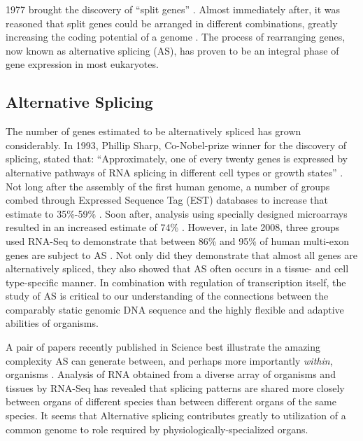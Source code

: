   1977 brought the discovery of ``split genes'' \citep{Berget1977,Chow1977}. Almost immediately after, it was reasoned that split genes could be arranged in different combinations, greatly increasing the coding potential of a genome \citep{Gilbert1978a}. The process of rearranging genes, now known as alternative splicing (AS), has proven to be an integral phase of gene expression in most eukaryotes. 

  \subsection{Alternative Splicing}\label{Intro:subsec:Alternative Splicing}

    The number of genes estimated to be alternatively spliced has grown considerably. In 1993, Phillip Sharp, Co-Nobel-prize winner for the discovery of splicing, stated that: ``Approximately, one of every twenty genes is expressed by alternative pathways of RNA splicing in different cell types or growth states'' \cite{Sharp2014}. Not long after the assembly of the first human genome, a number of groups combed through Expressed Sequence Tag (EST) databases to increase that estimate to 35\%-59\% \citep{Modrek2002}. Soon after, analysis using specially designed microarrays resulted in an increased estimate of 74\% \citep{Johnson2003}. However, in late 2008, three groups used RNA-Seq to demonstrate that between 86\% and 95\% of human multi-exon genes are subject to AS \citep{Pan2008, Wang2008, Sultan2008}. Not only did they demonstrate that almost all genes are alternatively spliced, they also showed that AS often occurs in a tissue- and cell type-specific manner. In combination with regulation of transcription itself, the study of AS is critical to our understanding of the connections between the comparably static genomic DNA sequence and the highly flexible and adaptive abilities of organisms.

    A pair of papers recently published in Science best illustrate the amazing complexity AS can generate between, and perhaps more importantly \textit{within}, organisms \citep{Barbosa-Morais2012,Merkin2012}. Analysis of RNA obtained from a diverse array of organisms and tissues by RNA-Seq has revealed that splicing patterns are shared more closely between organs of different species than between different organs of the same species. It seems that Alternative splicing contributes greatly to utilization of a common genome to role required by physiologically-specialized organs. 

